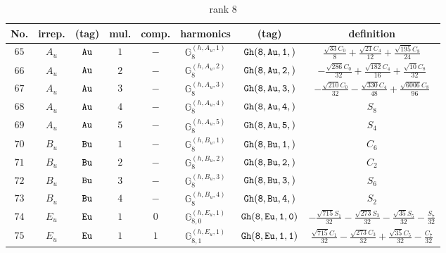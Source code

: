 \documentclass[fleqn,8pt]{jsarticle}
\begin{document}
\begin{table}[ht!]
\begin{center}
\caption{rank 8}
\renewcommand{\arraystretch}{1.3}
\begin{tabular}{cccccccc} \hline \hline
No. & irrep. & (tag) & mul. & comp. & harmonics & (tag) & definition \\ \hline
$ 65 $ & $ A_{u} $ & $ {\tt Au} $ & $ 1 $ & $ - $ & $ \mathbb{G}_{8}^{(h,A_{u},1)} $ & $ {\tt Gh(8,Au,1,)} $ & $ \frac{\sqrt{33} C_{0}}{8} + \frac{\sqrt{21} C_{4}}{12} + \frac{\sqrt{195} C_{8}}{24} $ \\
$ 66 $ & $ A_{u} $ & $ {\tt Au} $ & $ 2 $ & $ - $ & $ \mathbb{G}_{8}^{(h,A_{u},2)} $ & $ {\tt Gh(8,Au,2,)} $ & $ - \frac{\sqrt{286} C_{0}}{32} + \frac{\sqrt{182} C_{4}}{16} + \frac{\sqrt{10} C_{8}}{32} $ \\
$ 67 $ & $ A_{u} $ & $ {\tt Au} $ & $ 3 $ & $ - $ & $ \mathbb{G}_{8}^{(h,A_{u},3)} $ & $ {\tt Gh(8,Au,3,)} $ & $ - \frac{\sqrt{210} C_{0}}{32} - \frac{\sqrt{330} C_{4}}{48} + \frac{\sqrt{6006} C_{8}}{96} $ \\
$ 68 $ & $ A_{u} $ & $ {\tt Au} $ & $ 4 $ & $ - $ & $ \mathbb{G}_{8}^{(h,A_{u},4)} $ & $ {\tt Gh(8,Au,4,)} $ & $ S_{8} $ \\
$ 69 $ & $ A_{u} $ & $ {\tt Au} $ & $ 5 $ & $ - $ & $ \mathbb{G}_{8}^{(h,A_{u},5)} $ & $ {\tt Gh(8,Au,5,)} $ & $ S_{4} $ \\
$ 70 $ & $ B_{u} $ & $ {\tt Bu} $ & $ 1 $ & $ - $ & $ \mathbb{G}_{8}^{(h,B_{u},1)} $ & $ {\tt Gh(8,Bu,1,)} $ & $ C_{6} $ \\
$ 71 $ & $ B_{u} $ & $ {\tt Bu} $ & $ 2 $ & $ - $ & $ \mathbb{G}_{8}^{(h,B_{u},2)} $ & $ {\tt Gh(8,Bu,2,)} $ & $ C_{2} $ \\
$ 72 $ & $ B_{u} $ & $ {\tt Bu} $ & $ 3 $ & $ - $ & $ \mathbb{G}_{8}^{(h,B_{u},3)} $ & $ {\tt Gh(8,Bu,3,)} $ & $ S_{6} $ \\
$ 73 $ & $ B_{u} $ & $ {\tt Bu} $ & $ 4 $ & $ - $ & $ \mathbb{G}_{8}^{(h,B_{u},4)} $ & $ {\tt Gh(8,Bu,4,)} $ & $ S_{2} $ \\
$ 74 $ & $ E_{u} $ & $ {\tt Eu} $ & $ 1 $ & $ 0 $ & $ \mathbb{G}_{8,0}^{(h,E_{u},1)} $ & $ {\tt Gh(8,Eu,1,0)} $ & $ - \frac{\sqrt{715} S_{1}}{32} - \frac{\sqrt{273} S_{3}}{32} - \frac{\sqrt{35} S_{5}}{32} - \frac{S_{7}}{32} $ \\
$ 75 $ & $ E_{u} $ & $ {\tt Eu} $ & $ 1 $ & $ 1 $ & $ \mathbb{G}_{8,1}^{(h,E_{u},1)} $ & $ {\tt Gh(8,Eu,1,1)} $ & $ \frac{\sqrt{715} C_{1}}{32} - \frac{\sqrt{273} C_{3}}{32} + \frac{\sqrt{35} C_{5}}{32} - \frac{C_{7}}{32} $ \\

\end{tabular}
\end{center}
\end{table}
\end{document}
